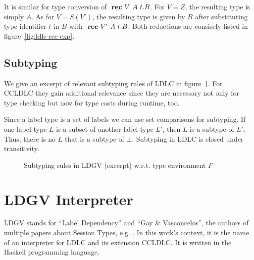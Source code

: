 It is similar for type conversion of $\text{ \textbf{rec} } V~A~t.B$. For $V=Z$, the resulting type is simply $A$. As for $V=S(V')$, the resulting type is given by $B$ after substituting type identifier $t$ in $B$ with $\text{ \textbf{rec} } V'~A~t.B$. Both reductions are consisely listed in figure~\ref{fig:ldlc-rec-exp}.

\subsection{Subtyping}

We give an excerpt of relevant subtyping rules of LDLC in figure~\ref{fig:ldgv-subtyping}. For CCLDLC they gain additional relevance since they are necessary not only for type checking but now for type casts during runtime, too.

Since a label type is a set of labels we can use set comparisons for subtyping. If one label type $L$ is a subset of another label type $L'$, then $L$ is a subtype of $L'$. Thus, there is no $L$ that is a subtype of $\bot$. Subtyping in LDLC is closed under transitivity.

\begin{figure}
\caption[Subtyping rules in LDGV (excerpt)]{Subtyping rules in LDGV (excerpt) w.r.t. type environment $\Gamma$}
\label{fig:ldgv-subtyping}
\end{figure}


\section{LDGV Interpreter}

LDGV stands for ``Label Dependency'' and ``Gay \& Vasconcelos'', the authors of multiple papers about Session Types, e.g. \cite{gayvasconcelos2010}. In this work's context, it is the name of an interpreter for LDLC and its extension CCLDLC. It is written in the Haskell programming language.

